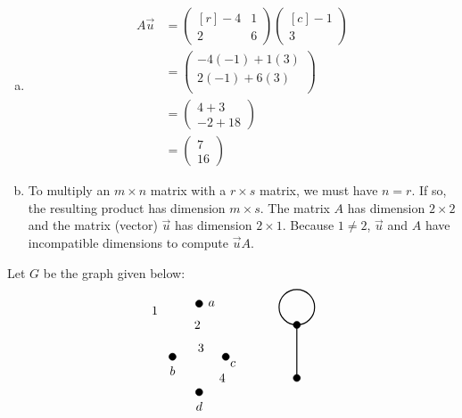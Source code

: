 \documentclass[12pt,letterpaper]{exam}
\begin{document}
\begin{questions}
\sol 
\begin{enumerate}[(a)]
\item 
	\[
	\begin{aligned}
	A \vec{u}&= \begin{pmatrix*}[r] -4 & 1 \\ 2 & 6 \end{pmatrix*}  \begin{pmatrix*}[c] -1 \\ 3 \end{pmatrix*} \\[0.3cm]
	&= \begin{pmatrix} -4(-1) + 1(3) \\ 2(-1) + 6(3) \\ \end{pmatrix} \\[0.3cm]
	&= \begin{pmatrix} 4 + 3 \\ -2 + 18 \end{pmatrix} \\[0.3cm]
	&= \begin{pmatrix} 7 \\ 16 \end{pmatrix}
	\end{aligned}
	\] \pspace

\item To multiply an $m \times n$ matrix with a $r \times s$ matrix, we must have $n= r$. If so, the resulting product has dimension $m \times s$. The matrix $A$ has dimension $2 \times 2$ and the matrix (vector) $\vec{u}$ has dimension $2 \times 1$. Because $1 \neq 2$, $\vec{u}$ and $A$ have incompatible dimensions to compute $\vec{u} A$. 
\end{enumerate}



\newpage
\question[10] Let $G$ be the graph given below:
	\[
	\begin{tikzpicture}
	\draw[fill=black] (0.75,1.5) circle (0.1); %
	\draw[fill=black] (0,0) circle (0.1); %
	\draw[fill=black] (1.5,0) circle (0.1); %
	\draw[fill=black] (0.75,-1) circle (0.1); %
	
	\node at (1.1,1.5) {$a$};
	\node at (0,-0.4) {$b$};
	\node at (1.7,-0.2) {$c$};
	\node at (0.75,-1.4) {$d$};
	
	\node at (-0.5,1.3) {$1$};
	\node at (0.7,0.9) {$2$};
	\node at (0.8,0.25) {$3$};
	\node at (1.4,-0.6) {$4$};	
	
	\draw[line width=0.03cm] (3.5,-0.6) -- (3.5,0.9); %
	\draw[line width=0.03cm] (3.5,1.4) circle (0.5); %
	\draw[fill=black] (3.5,0.9) circle (0.1); %
	\draw[fill=black] (3.5,-0.6) circle (0.1); %
	

\end{tikzpicture}\]
\end{questions}
\end{document}

